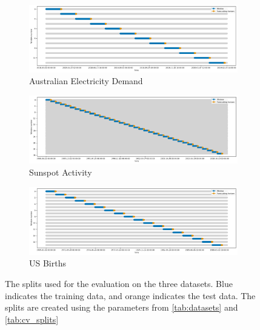 \begin{figure}
    \centering
    \begin{subfigure}{1\textwidth}
        \centering
        \includegraphics[width=\textwidth]{Figures/AusElecSplit.png}
        \caption{Australian Electricity Demand}
        \label{fig:aus_split}
    \end{subfigure}

    \begin{subfigure}{1\textwidth}
        \centering
        \includegraphics[width=\textwidth]{Figures/SunspotSplit.png}
        \caption{Sunspot Activity}
        \label{fig:sunspot_split}
    \end{subfigure}

    \begin{subfigure}{1\textwidth}
        \centering
        \includegraphics[width=\textwidth]{Figures/USBirthSplit.png}
        \caption{US Births}
        \label{fig:usbirth_split}

    \end{subfigure}
    \caption{The splits used for the evaluation on the three datasets. Blue indicates the training data, and orange indicates the test data. The splits are created using the parameters from \autoref{tab:datasets} and \autoref{tab:cv_splits}}
    \label{fig:splits}
\end{figure}

